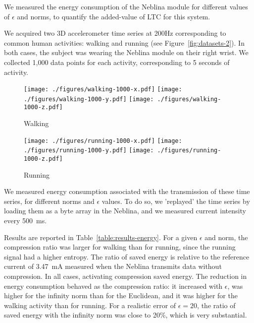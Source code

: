 \documentclass[10pt, conference, compsocconf]{IEEEtran}
\newcommand{\todo}[1]{\marginpar{\parbox{18mm}{\flushleft\tiny\color{red}\textbf{TODO}:
      #1}}}
\begin{document}
We measured the energy consumption of the Neblina module 
for different values of $\epsilon$ and norms, to quantify the 
added-value of LTC for this system. 

We acquired two 3D accelerometer time series at 200Hz corresponding to 
common human activities: walking and running (see Figure~\ref{fig:datasets-2}). In both cases, the 
subject was wearing the Neblina module on their right wrist.
We collected 1,000 data points for each activity, corresponding to 
5 seconds of activity.
\begin{figure*}
\begin{subfigure}{2\columnwidth}
\texttt{[image: ./figures/walking-1000-x.pdf]}
\texttt{[image: ./figures/walking-1000-y.pdf]}
\texttt{[image: ./figures/walking-1000-z.pdf]}
\caption{Walking}
\end{subfigure}
\begin{subfigure}{2\columnwidth}
\texttt{[image: ./figures/running-1000-x.pdf]}
\texttt{[image: ./figures/running-1000-y.pdf]}
\texttt{[image: ./figures/running-1000-z.pdf]}
\caption{Running}
\end{subfigure}
\caption{Time series used in Experiment 2}
\label{fig:datasets-2}
\end{figure*}

We measured energy consumption associated with the transmission of 
these time series, for different norms and $\epsilon$ values. To do so, 
we 'replayed' the time series by loading them as a byte array in the 
Neblina, and we measured current intensity every 500~ms.

Results are reported in Table~\ref{table:results-energy}\todo{errors don't make sense}.
For a given $\epsilon$ and norm, the compression ratio was larger for 
walking than for running, since the running signal had a higher 
entropy. The ratio of saved energy is relative to the reference current of 
3.47~mA measured when the Neblina transmits data without compression.
In all cases, activating compression saved energy. The reduction in energy
consumption behaved as the compression ratio: it increased with $\epsilon$,
was higher for the infinity norm than for the Euclidean, and it was 
higher for the walking activity than for running. For a realistic error 
of $\epsilon=20$\todo{unit}, the ratio of saved energy with the infinity norm was
close to 20\%, which is very substantial.
\end{document}
